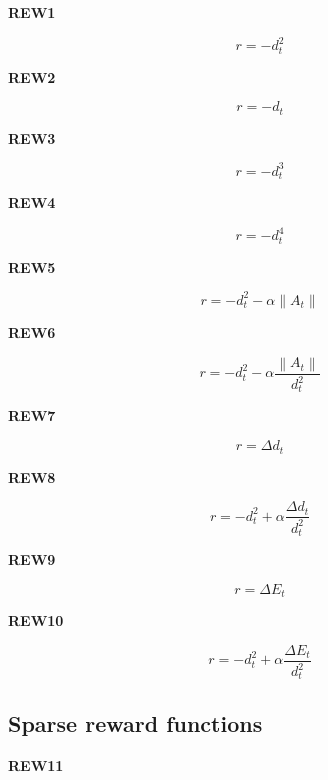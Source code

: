 \documentclass{article}
\newcommand{\norm}[1]{\left\lVert#1\right\rVert}
\begin{document}
\textbf{REW1} 

\begin{equation}
r = - d_t^2
\end{equation}

\textbf{REW2} 

\begin{equation}
r = - d_t
\end{equation}

\textbf{REW3} 

\begin{equation}
r = - d_t^3
\end{equation}

\textbf{REW4} 

\begin{equation}
r = - d_t^4
\end{equation}

\textbf{REW5} 

\begin{equation}
r = - d_t^2 - \alpha \norm{A_t}
\end{equation}

\textbf{REW6} 

\begin{equation}
r = - d_t^2 - \alpha \frac{\norm{A_t}}{d_t^2}
\end{equation}

\textbf{REW7} 

\begin{equation}
r = \Delta d_t
\end{equation}

\textbf{REW8} 

\begin{equation}
r = - d_t^2 + \alpha \frac{\Delta d_t}{d_t^2}
\end{equation}

\textbf{REW9} 

\begin{equation}
r = \Delta E_t
\end{equation}

\textbf{REW10} 

\begin{equation}
r = - d_t^2 + \alpha \frac{\Delta E_t}{d_t^2}
\end{equation}


\subsection{Sparse reward functions}

\textbf{REW11} 
\end{document}
